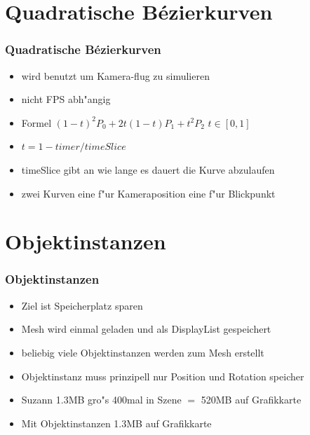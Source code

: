 \documentclass[notes]{beamer} %
\begin{document}
\section{Quadratische B\'{e}zierkurven}
\begin{frame}
\begin{spacing}{1}
\frametitle{Quadratische B\'{e}zierkurven}
\begin{itemize}
\item wird benutzt um Kamera-flug zu simulieren
\item nicht FPS abh"angig
\item Formel $(1-t)^{2}P_{0} + 2t(1-t)P_{1} + t^{2}P_{2}$ $t \in [0,1]$
\item $t = 1 - timer / timeSlice$ 
\item timeSlice gibt an wie lange es dauert die Kurve abzulaufen
\item zwei Kurven eine f"ur Kameraposition eine f"ur Blickpunkt
\end{itemize}
\end{spacing}
\end{frame}

\section{Objektinstanzen}
\begin{frame}
\begin{spacing}{1}
\frametitle{Objektinstanzen}
\begin{itemize}
\item Ziel ist Speicherplatz sparen
\item Mesh wird einmal geladen und als DisplayList gespeichert
\item beliebig viele Objektinstanzen werden zum Mesh erstellt
\item Objektinstanz muss prinzipell nur Position und Rotation speicher
\item Suzann 1.3MB gro"s 400mal in Szene $=$ 520MB auf Grafikkarte
\item Mit Objektinstanzen 1.3MB auf Grafikkarte
\end{itemize}
\end{spacing}
\end{frame}

\end{document}

